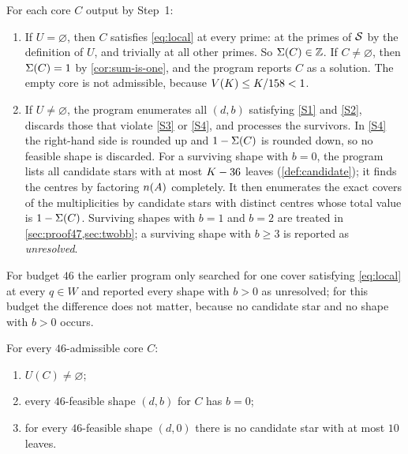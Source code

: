\documentclass[11pt]{article}
\begin{document}
For each core $C$ output by Step~1:
\begin{enumerate}[label=(\alph*)]
\item If $U=\varnothing$, then $C$ satisfies \eqref{eq:local} at every prime: at the primes of $\mathcal{S}$ by the definition of $U$, and trivially at all other primes. So $\Sigma(C)\in\mathbb{Z}$. If $C\ne\varnothing$, then $\Sigma(C)=1$ by \cref{cor:sum-is-one}, and the program reports $C$ as a solution. The empty core is not admissible, because $V(K)\le K/158<1$.
\item If $U\ne\varnothing$, the program enumerates all $(d,b)$ satisfying \ref{S1} and \ref{S2}, discards those that violate \ref{S3} or \ref{S4}, and processes the survivors.
In \ref{S4} the right-hand side is rounded up and $1-\Sigma(C)$ is rounded down, so no feasible shape is discarded.
For a surviving shape with $b=0$, the program lists all candidate stars with at most $K-36$ leaves (\cref{def:candidate}); it finds the centres by factoring $n(A)$ completely.
It then enumerates the exact covers of the multiplicities by candidate stars with distinct centres whose total value is $1-\Sigma(C)$.
Surviving shapes with $b=1$ and $b=2$ are treated in \cref{sec:proof47,sec:twobb}; a surviving shape with $b\ge3$ is reported as \emph{unresolved}.
\end{enumerate}
For budget $46$ the earlier program  only searched for one cover satisfying \eqref{eq:local} at every $q\in W$ and reported every shape with $b>0$ as unresolved; for this budget the difference does not matter, because no candidate star and no shape with $b>0$ occurs.

\begin{claim}\label{claim:46}
For every $46$-admissible core $C$:
\begin{enumerate}[label=\textup{(\roman*)}]
\item $U(C)\ne\varnothing$;
\item every $46$-feasible shape $(d,b)$ for $C$ has $b=0$;
\item for every $46$-feasible shape $(d,0)$ there is no candidate star with at most $10$ leaves.
\end{enumerate}
\end{claim}
\end{document}
